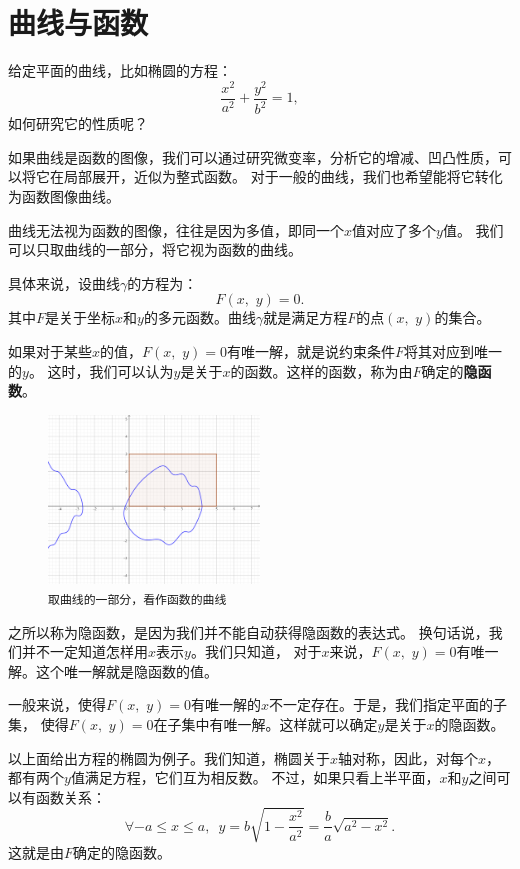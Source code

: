 \documentclass[12pt,UTF8]{ctexbook}
\theoremstyle{definition}
\theoremstyle{plain}
\begin{document}
\section{曲线与函数}

给定平面的曲线，比如椭圆的方程：
$$ \frac{x^2}{a^2} + \frac{y^2}{b^2} = 1,$$
如何研究它的性质呢？

如果曲线是函数的图像，我们可以通过研究微变率，分析它的增减、凹凸性质，可以将它在局部展开，近似为整式函数。
对于一般的曲线，我们也希望能将它转化为函数图像曲线。

曲线无法视为函数的图像，往往是因为多值，即同一个$x$值对应了多个$y$值。
我们可以只取曲线的一部分，将它视为函数的曲线。

具体来说，设曲线$\gamma$的方程为：
$$ F(x, \,\, y) = 0. $$
其中$F$是关于坐标$x$和$y$的多元函数。曲线$\gamma$就是满足方程$F$的点$(x,\,\,y)$的集合。

如果对于某些$x$的值，$F(x, \,\,y) = 0$有唯一解，就是说约束条件$F$将其对应到唯一的$y$。
这时，我们可以认为$y$是关于$x$的函数。这样的函数，称为由$F$确定的\textbf{隐函数}。

\begin{figure} %
    \vspace{-30pt}
    \flushright
    \includegraphics[width=0.5\textwidth]{tu/复杂平面曲线.png}
    \caption*{\texttt{取曲线的一部分，看作函数的曲线}}
\end{figure}

之所以称为隐函数，是因为我们并不能自动获得隐函数的表达式。
换句话说，我们并不一定知道怎样用$x$表示$y$。我们只知道，
对于$x$来说，$F(x, \,\,y) = 0$有唯一解。这个唯一解就是隐函数的值。

一般来说，使得$F(x, \,\,y) = 0$有唯一解的$x$不一定存在。于是，我们指定平面的子集，
使得$F(x, \,\,y) = 0$在子集中有唯一解。这样就可以确定$y$是关于$x$的隐函数。

以上面给出方程的椭圆为例子。我们知道，椭圆关于$x$轴对称，因此，对每个$x$，都有两个$y$值满足方程，它们互为相反数。
不过，如果只看上半平面，$x$和$y$之间可以有函数关系：
$$ \forall -a\leqslant x \leqslant a, \,\,\, y = b\sqrt{1 - \frac{x^2}{a^2}}= \frac{b}{a}\sqrt{a^2 - x^2}. $$
这就是由$F$确定的隐函数。
\end{document}
